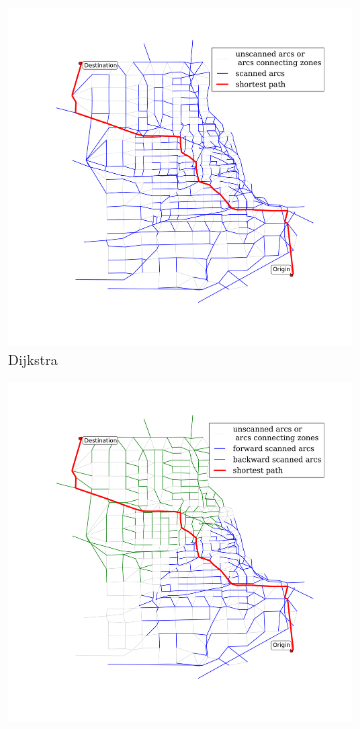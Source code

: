 \begin{figure}[H]
    \centering
    \begin{subfigure}{.5\textwidth}
        \centering
        \includegraphics[width=\textwidth,trim=120px 120px 48px 120px,clip]{img/chicago_dijkstra}
        \caption{Dijkstra}
        \label{fig:chicago_dijkstra}
    \end{subfigure}%
    \begin{subfigure}{.5\textwidth}
        \centering
        \includegraphics[width=\textwidth,trim=120px 120px 48px 120px,clip]{img/chicago_bidirect}

\end{subfigure}
\end{figure}
